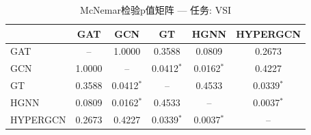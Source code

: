 \begin{table}[htbp]
\centering
\caption{McNemar检验p值矩阵 — 任务: VSI}
\label{tab:mcnemar_VSI}
\begin{tabular}{lccccc}
\toprule
 & GAT & GCN & GT & HGNN & HYPERGCN \\
\midrule
GAT & -- & 1.0000 & 0.3588 & 0.0809 & 0.2673 \\
GCN & 1.0000 & -- & 0.0412$^*$ & 0.0162$^*$ & 0.4227 \\
GT & 0.3588 & 0.0412$^*$ & -- & 0.4533 & 0.0339$^*$ \\
HGNN & 0.0809 & 0.0162$^*$ & 0.4533 & -- & 0.0037$^*$ \\
HYPERGCN & 0.2673 & 0.4227 & 0.0339$^*$ & 0.0037$^*$ & -- \\
\bottomrule
\end{tabular}
\end{table}